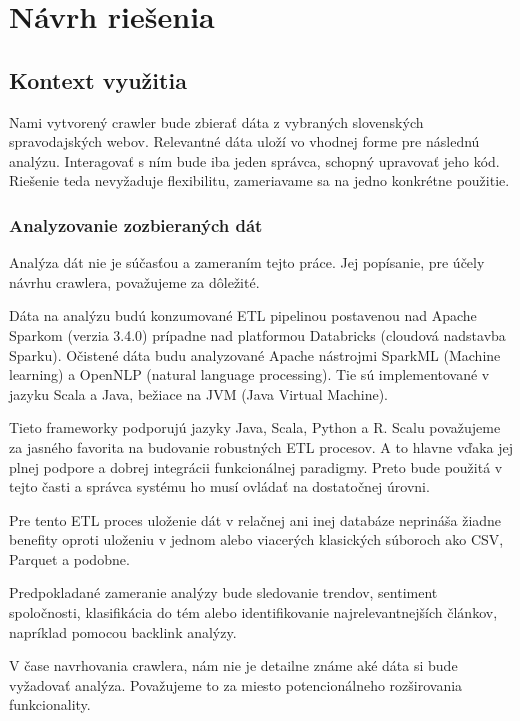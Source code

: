 
\chapter{Návrh riešenia}
\label{methodology}

\section{Kontext využitia}

Nami vytvorený crawler bude zbierať dáta z vybraných slovenských spravodajských webov. Relevantné dáta uloží vo vhodnej forme pre následnú analýzu. Interagovať s ním bude iba jeden správca, schopný upravovať jeho kód. Riešenie teda nevyžaduje flexibilitu, zameriavame sa na jedno konkrétne použitie. 

\subsection{Analyzovanie zozbieraných dát}
Analýza dát nie je súčasťou a zameraním tejto práce. Jej popísanie, pre účely návrhu crawlera, považujeme za dôležité.

Dáta na analýzu budú konzumované ETL pipelinou postavenou nad Apache Sparkom (verzia 3.4.0) prípadne nad platformou Databricks (cloudová nadstavba Sparku). Očistené dáta budu analyzované Apache nástrojmi SparkML (Machine learning) a OpenNLP (natural language processing). Tie sú implementované v jazyku Scala a Java, bežiace na JVM (Java Virtual Machine).


Tieto frameworky podporujú jazyky Java, Scala, Python a R. Scalu považujeme za jasného favorita na budovanie robustných ETL procesov. A to hlavne vďaka jej plnej podpore a dobrej integrácii funkcionálnej paradigmy. Preto bude použitá v tejto časti a správca systému ho musí ovládať na dostatočnej úrovni.

Pre tento ETL proces uloženie dát v relačnej ani inej databáze neprináša žiadne benefity oproti uloženiu v jednom alebo viacerých klasických súboroch ako CSV, Parquet a podobne. 

Predpokladané zameranie analýzy bude sledovanie trendov, sentiment spoločnosti, klasifikácia do tém alebo identifikovanie najrelevantnejších článkov, napríklad pomocou backlink analýzy. 

V čase navrhovania crawlera, nám nie je detailne známe aké dáta si bude vyžadovať analýza. Považujeme to za miesto potencionálneho rozširovania funkcionality. 

